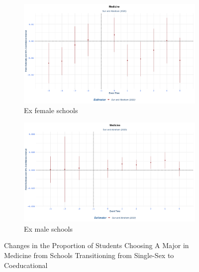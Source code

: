\begin{figure}[H]
    \centering
    \begin{subfigure}[b]{0.45\textwidth}
        \centering
        \includegraphics[width=\textwidth]{Graph/Results/stagered_ex_females_MEDICINE.png}
        \caption{Ex female schools }
        \label{fig:staggered_females_medicine}
    \end{subfigure}
    \hfill
    \begin{subfigure}[b]{0.45\textwidth}
        \centering
        \includegraphics[width=\textwidth]{Graph/Results/stagered_ex_males_MEDICINE.png}
        \caption{Ex male schools}
        \label{fig:staggered_males_medicine}
    \end{subfigure}
       \caption{ Changes in the Proportion of Students Choosing A Major in Medicine from Schools Transitioning from Single-Sex to Coeducational}
    \label{fig:staggered_medicine}
\end{figure}

